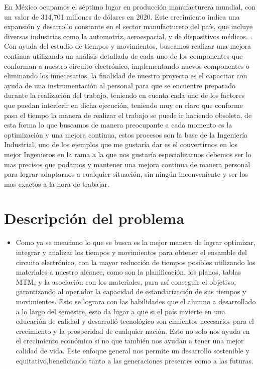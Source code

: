 \begin{itemize}
       En México ocupamos el séptimo lugar en  producción manufacturera mundial, con un valor de 314,701 millones de dólares en 2020. Este crecimiento indica una expansión y desarrollo constante en el sector manufacturero del país, que incluye diversas industrias como la automotriz, aeroespacial, y de dispositivos médicos. \cite{McKinsey}.
       Con ayuda del estudio de tiempos y movimientos, buscamos realizar una mejora continua utilizando un análisis detallado de cada uno de los componentes que conforman a nuestro circuito electrónico, implementando nuevos componentes o eliminando los innecesarios, la finalidad de nuestro proyecto es el capacitar con ayuda de una instrumentación al personal para que se encuentre preparado durante la realización del trabajo, teniendo en cuenta cada uno de los factores que puedan interferir en dicha ejecución, teniendo muy en claro que conforme pasa el tiempo la manera de realizar el trabajo se puede ir haciendo obsoleta, de esta forma lo que buscamos de manera preocupante a cada momento es la optimización y una mejora continua, estos procesos son la base de la Ingeniería Industrial, uno de los ejemplos que me gustaría dar es el convertirnos en los mejor Ingenieros en la rama a la que nos gustaría especializarnos debemos ser lo mas precisos que podamos y mantener una mejora continua  de manera personal para lograr adaptarnos a cualquier situación, sin ningún inconveniente y ser los mas exactos a la hora de trabajar.  
    \end{itemize}
    \section{ Descripción del problema}
    \begin{itemize}
        \item Como ya se menciono lo que se busca es la mejor manera de lograr optimizar, integrar y analizar los tiempos y movimientos para obtener el ensamble del circuito electrónico, con la mayor reducción de tiempos posibles utilizando los materiales a nuestro alcance, como son la planificación, los planos, tablas MTM, y la asociación con los materiales, para así conseguir el objetivo, garantizando al operador la capacidad de estandarización de sus tiempos y movimientos.
        Esto se lograra con las habilidades que el alumno a desarrollado a lo largo del semestre, esto da lugar a que si el país invierte en una educación de calidad y desarrolló tecnológico son cimientos necesarios para el crecimiento y la prosperidad de cualquier nación. Esto no solo nos ayuda en el crecimiento económico si no que también nos ayudan a tener una mejor calidad de vida. Este enfoque general nos permite un desarrollo sostenible y equitativo,beneficiando tanto a las generaciones presentes como a las futuras.
    \end{itemize}
    
